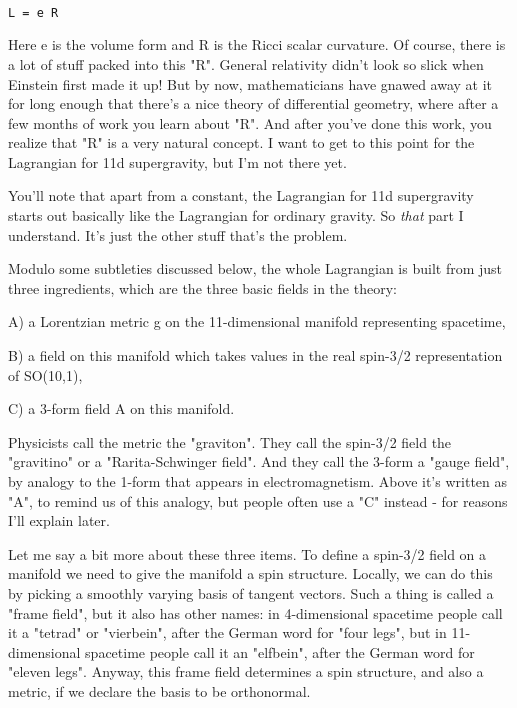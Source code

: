 \begin{verbatim}

L = e R 
\end{verbatim}
    
Here e is the volume form and R is the Ricci scalar curvature.  Of
course, there is a lot of stuff packed into this "R".  General relativity 
didn't look so slick when Einstein first made it up!  But by now,
mathematicians have gnawed away at it for long enough that there's a
nice theory of differential geometry, where after a few months of work
you learn about "R".  And after you've done this work, you realize that
"R" is a very natural concept.  I want to get to this point for the
Lagrangian for 11d supergravity, but I'm not there yet.
 
You'll note that apart from a constant, the Lagrangian for 11d 
supergravity starts out basically like the Lagrangian for ordinary 
gravity.  So \emph{that} part I understand.  It's just the other stuff  
that's the problem. 
 
Modulo some subtleties discussed below, the whole Lagrangian is built 
from just three ingredients, which are the three basic fields in the 
theory: 
 
A) a Lorentzian metric g on the 11-dimensional manifold 
representing spacetime, 
 
B) a field \psi  on this manifold which takes values in the real  
spin-3/2 representation of SO(10,1), 
 
C) a 3-form field A on this manifold. 
 
Physicists call the metric the "graviton".  They call the spin-3/2 field 
the "gravitino" or a "Rarita-Schwinger field".  And they call the 3-form  
a "gauge field", by analogy to the 1-form that appears in electromagnetism. 
Above it's written as "A", to remind us of this analogy, but people often  
use a "C" instead - for reasons I'll explain later. 
 
Let me say a bit more about these three items.  To define a spin-3/2
field on a manifold we need to give the manifold a spin structure.
Locally, we can do this by picking a smoothly varying basis of tangent
vectors.  Such a thing is called a "frame field", but it also has other
names: in 4-dimensional spacetime people call it a "tetrad" or
"vierbein", after the German word for "four legs", but in 11-dimensional
spacetime people call it an "elfbein", after the German word for "eleven
legs".  Anyway, this frame field determines a spin structure, and also
a metric, if we declare the basis to be orthonormal.
 
